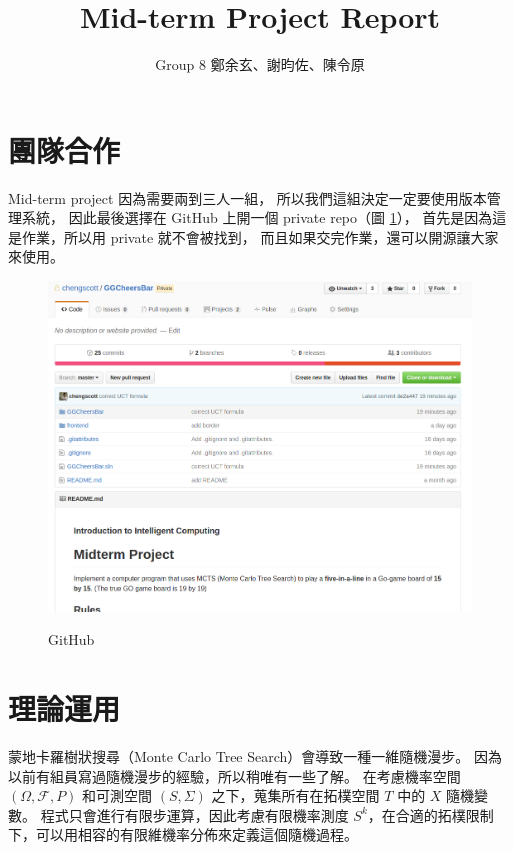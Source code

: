 \documentclass[12pt]{article}
\begin{document}
\begin{CJK}{UTF8}{bsmi}
\title{Mid-term Project Report}
\author{Group 8 鄭余玄、謝昀佐、陳令原}
\date{}
\maketitle
\section{團隊合作}
Mid-term project 因為需要兩到三人一組，
所以我們這組決定一定要使用版本管理系統，
因此最後選擇在 GitHub 上開一個 private repo（圖 \ref{gh}），
首先是因為這是作業，所以用 private 就不會被找到，
而且如果交完作業，還可以開源讓大家來使用。

\begin{figure}[h]
  \caption{GitHub}
  \centering
  \includegraphics[width=1\textwidth]{gh}
  \label{gh}
\end{figure}


\section{理論運用}
蒙地卡羅樹狀搜尋（Monte Carlo Tree Search）會導致一種一維隨機漫步。
因為以前有組員寫過隨機漫步的經驗，所以稍唯有一些了解。
在考慮機率空間 $(\Omega, \mathcal{F}, P)$ 和可測空間 $(S, \Sigma)$ 之下，蒐集所有在拓樸空間 $T$ 中的 $X$ 隨機變數。
程式只會進行有限步運算，因此考慮有限機率測度 $S^k$，在合適的拓樸限制下，可以用相容的有限維機率分佈來定義這個隨機過程。


\end{CJK}
\end{document}
